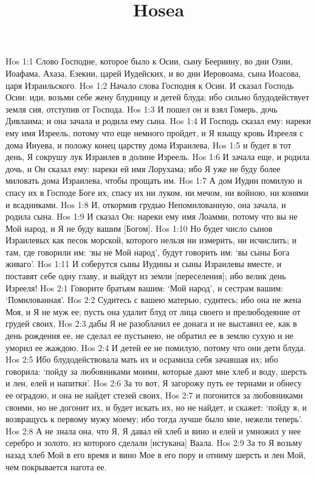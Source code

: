 

\title{Hosea}

Hos 1:1  Слово Господне, которое было к Осии, сыну Беериину, во дни Озии, Иоафама, Ахаза, Езекии, царей Иудейских, и во дни Иеровоама, сына Иоасова, царя Израильского.
Hos 1:2  Начало слова Господня к Осии. И сказал Господь Осии: иди, возьми себе жену блудницу и детей блуда; ибо сильно блудодействует земля сия, отступив от Господа.
Hos 1:3  И пошел он и взял Гомерь, дочь Дивлаима; и она зачала и родила ему сына.
Hos 1:4  И Господь сказал ему: нареки ему имя Изреель, потому что еще немного пройдет, и Я взыщу кровь Изрееля с дома Ииуева, и положу конец царству дома Израилева,
Hos 1:5  и будет в тот день, Я сокрушу лук Израилев в долине Изреель.
Hos 1:6  И зачала еще, и родила дочь, и Он сказал ему: нареки ей имя Лорухама; ибо Я уже не буду более миловать дома Израилева, чтобы прощать им.
Hos 1:7  А дом Иудин помилую и спасу их в Господе Боге их, спасу их ни луком, ни мечом, ни войною, ни конями и всадниками.
Hos 1:8  И, откормив грудью Непомилованную, она зачала, и родила сына.
Hos 1:9  И сказал Он: нареки ему имя Лоамми, потому что вы не Мой народ, и Я не буду вашим [Богом].
Hos 1:10  Но будет число сынов Израилевых как песок морской, которого нельзя ни измерить, ни исчислить; и там, где говорили им: `вы не Мой народ', будут говорить им: `вы сыны Бога живаго'.
Hos 1:11  И соберутся сыны Иудины и сыны Израилевы вместе, и поставят себе одну главу, и выйдут из земли [переселения]; ибо велик день Изрееля!
Hos 2:1  Говорите братьям вашим: `Мой народ', и сестрам вашим: `Помилованная'.
Hos 2:2  Судитесь с вашею матерью, судитесь; ибо она не жена Моя, и Я не муж ее; пусть она удалит блуд от лица своего и прелюбодеяние от грудей своих,
Hos 2:3  дабы Я не разоблачил ее донага и не выставил ее, как в день рождения ее, не сделал ее пустынею, не обратил ее в землю сухую и не уморил ее жаждою.
Hos 2:4  И детей ее не помилую, потому что они дети блуда.
Hos 2:5  Ибо блудодействовала мать их и осрамила себя зачавшая их; ибо говорила: `пойду за любовниками моими, которые дают мне хлеб и воду, шерсть и лен, елей и напитки'.
Hos 2:6  За то вот, Я загорожу путь ее тернами и обнесу ее оградою, и она не найдет стезей своих,
Hos 2:7  и погонится за любовниками своими, но не догонит их, и будет искать их, но не найдет, и скажет: `пойду я, и возвращусь к первому мужу моему; ибо тогда лучше было мне, нежели теперь'.
Hos 2:8  А не знала она, что Я, Я давал ей хлеб и вино и елей и умножил у нее серебро и золото, из которого сделали [истукана] Ваала.
Hos 2:9  За то Я возьму назад хлеб Мой в его время и вино Мое в его пору и отниму шерсть и лен Мой, чем покрывается нагота ее.
